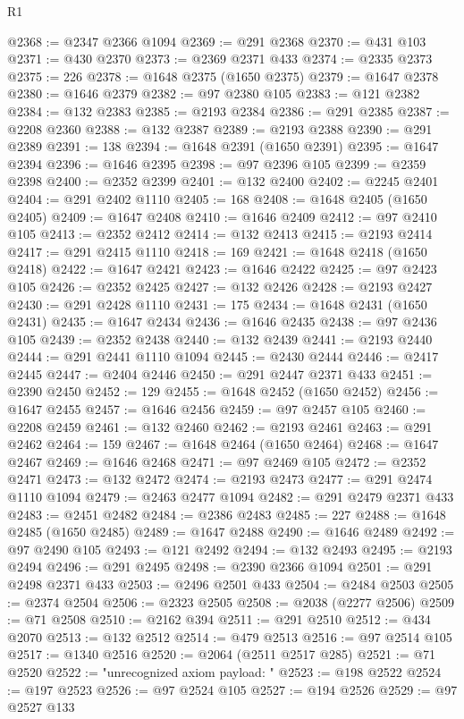 \begin{lexlean}{R1}
\begin{coremodule}
@2368 := @2347 @2366 @1094
@2369 := @291 @2368
@2370 := @431 @103
@2371 := @430 @2370
@2373 := @2369 @2371 @433
@2374 := @2335 @2373
@2375 := 226
@2378 := @1648 @2375 (@1650 @2375)
@2379 := @1647 @2378
@2380 := @1646 @2379
@2382 := @97 @2380 @105
@2383 := @121 @2382
@2384 := @132 @2383
@2385 := @2193 @2384
@2386 := @291 @2385
@2387 := @2208 @2360
@2388 := @132 @2387
@2389 := @2193 @2388
@2390 := @291 @2389
@2391 := 138
@2394 := @1648 @2391 (@1650 @2391)
@2395 := @1647 @2394
@2396 := @1646 @2395
@2398 := @97 @2396 @105
@2399 := @2359 @2398
@2400 := @2352 @2399
@2401 := @132 @2400
@2402 := @2245 @2401
@2404 := @291 @2402 @1110
@2405 := 168
@2408 := @1648 @2405 (@1650 @2405)
@2409 := @1647 @2408
@2410 := @1646 @2409
@2412 := @97 @2410 @105
@2413 := @2352 @2412
@2414 := @132 @2413
@2415 := @2193 @2414
@2417 := @291 @2415 @1110
@2418 := 169
@2421 := @1648 @2418 (@1650 @2418)
@2422 := @1647 @2421
@2423 := @1646 @2422
@2425 := @97 @2423 @105
@2426 := @2352 @2425
@2427 := @132 @2426
@2428 := @2193 @2427
@2430 := @291 @2428 @1110
@2431 := 175
@2434 := @1648 @2431 (@1650 @2431)
@2435 := @1647 @2434
@2436 := @1646 @2435
@2438 := @97 @2436 @105
@2439 := @2352 @2438
@2440 := @132 @2439
@2441 := @2193 @2440
@2444 := @291 @2441 @1110 @1094
@2445 := @2430 @2444
@2446 := @2417 @2445
@2447 := @2404 @2446
@2450 := @291 @2447 @2371 @433
@2451 := @2390 @2450
@2452 := 129
@2455 := @1648 @2452 (@1650 @2452)
@2456 := @1647 @2455
@2457 := @1646 @2456
@2459 := @97 @2457 @105
@2460 := @2208 @2459
@2461 := @132 @2460
@2462 := @2193 @2461
@2463 := @291 @2462
@2464 := 159
@2467 := @1648 @2464 (@1650 @2464)
@2468 := @1647 @2467
@2469 := @1646 @2468
@2471 := @97 @2469 @105
@2472 := @2352 @2471
@2473 := @132 @2472
@2474 := @2193 @2473
@2477 := @291 @2474 @1110 @1094
@2479 := @2463 @2477 @1094
@2482 := @291 @2479 @2371 @433
@2483 := @2451 @2482
@2484 := @2386 @2483
@2485 := 227
@2488 := @1648 @2485 (@1650 @2485)
@2489 := @1647 @2488
@2490 := @1646 @2489
@2492 := @97 @2490 @105
@2493 := @121 @2492
@2494 := @132 @2493
@2495 := @2193 @2494
@2496 := @291 @2495
@2498 := @2390 @2366 @1094
@2501 := @291 @2498 @2371 @433
@2503 := @2496 @2501 @433
@2504 := @2484 @2503
@2505 := @2374 @2504
@2506 := @2323 @2505
@2508 := @2038 (@2277 @2506)
@2509 := @71 @2508
@2510 := @2162 @394
@2511 := @291 @2510
@2512 := @434 @2070
@2513 := @132 @2512
@2514 := @479 @2513
@2516 := @97 @2514 @105
@2517 := @1340 @2516
@2520 := @2064 (@2511 @2517 @285)
@2521 := @71 @2520
@2522 := "unrecognized axiom payload: "
@2523 := @198 @2522
@2524 := @197 @2523
@2526 := @97 @2524 @105
@2527 := @194 @2526
@2529 := @97 @2527 @133

\end{coremodule}
\end{lexlean}
